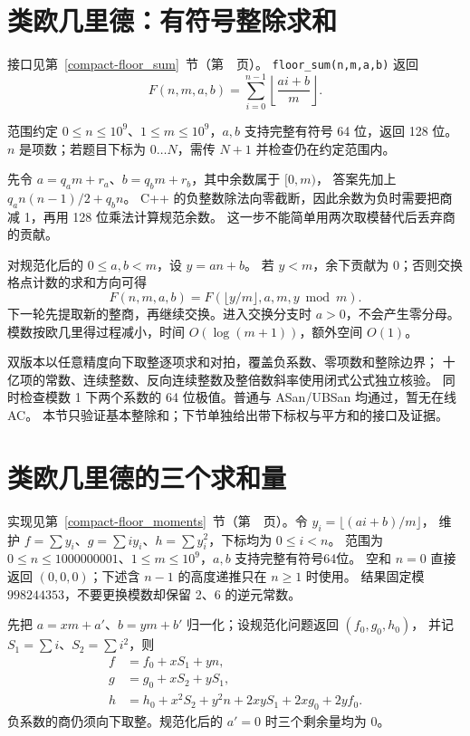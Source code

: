 \section{类欧几里德：有符号整除求和}\label{knowledge-floor-sum}
接口见第~\ref{compact-floor_sum}~节（第~\pageref{compact-floor_sum}~页）。
\texttt{floor\_sum(n,m,a,b)} 返回
\[
F(n,m,a,b)=\sum_{i=0}^{n-1}\left\lfloor\frac{ai+b}{m}\right\rfloor.
\]

范围约定 $0\le n\le10^9$、$1\le m\le10^9$，$a,b$ 支持完整有符号 64 位，返回 128 位。
$n$ 是项数；若题目下标为 $0\ldots N$，需传 $N+1$ 并检查仍在约定范围内。

先令 $a=q_a m+r_a$、$b=q_bm+r_b$，其中余数属于 $[0,m)$，
答案先加上 $q_a n(n-1)/2+q_b n$。
C++ 的负整数除法向零截断，因此余数为负时需要把商减 1，再用 128 位乘法计算规范余数。
这一步不能简单用两次取模替代后丢弃商的贡献。

对规范化后的 $0\le a,b<m$，设 $y=an+b$。
若 $y<m$，余下贡献为 0；否则交换格点计数的求和方向可得
\[
F(n,m,a,b)=F(\lfloor y/m\rfloor,a,m,y\bmod m).
\]
下一轮先提取新的整商，再继续交换。进入交换分支时 $a>0$，不会产生零分母。
模数按欧几里得过程减小，时间 $O(\log(m+1))$，额外空间 $O(1)$。

双版本以任意精度向下取整逐项求和对拍，覆盖负系数、零项数和整除边界；
十亿项的常数、连续整数、反向连续整数及整倍数斜率使用闭式公式独立核验。
同时检查模数 1 下两个系数的 64 位极值。普通与 ASan/UBSan 均通过，暂无在线 AC。
本节只验证基本整除和；下节单独给出带下标权与平方和的接口及证据。

\section{类欧几里德的三个求和量}\label{knowledge-floor-moments}
实现见第~\ref{compact-floor_moments}~节（第~\pageref{compact-floor_moments}~页）。令 $y_i=\lfloor(ai+b)/m\rfloor$，
维护 $f=\sum y_i$、$g=\sum i y_i$、$h=\sum y_i^2$，下标均为 $0\le i<n$。
范围为 $0\le n\le1000000001$、$1\le m\le10^9$，$a,b$ 支持完整有符号64位。
空和 $n=0$ 直接返回 $(0,0,0)$；下述含 $n-1$ 的高度递推只在 $n\ge1$ 时使用。
结果固定模 $998244353$，不要更换模数却保留 2、6 的逆元常数。

先把 $a=xm+a'$、$b=ym+b'$ 归一化；设规范化问题返回 $(f_0,g_0,h_0)$，
并记 $S_1=\sum i$、$S_2=\sum i^2$，则
\[
\begin{aligned}
f&=f_0+xS_1+yn,\\
g&=g_0+xS_2+yS_1,\\
h&=h_0+x^2S_2+y^2n+2xyS_1+2xg_0+2yf_0.
\end{aligned}
\]
负系数的商仍须向下取整。规范化后的 $a'=0$ 时三个剩余量均为 0。

